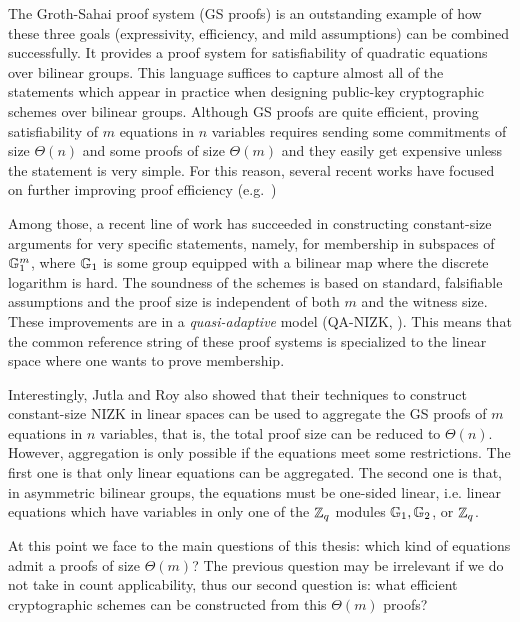 The Groth-Sahai proof system (GS proofs) \cite{SIAMJC:GroSah12} 
  is an outstanding example of how these three goals (expressivity, 
  efficiency, and mild assumptions) can be combined successfully.  
It provides a proof system for satisfiability of quadratic equations over 
  bilinear groups. This language suffices to capture almost all of the 
  statements which appear 
  in practice when designing public-key cryptographic schemes over bilinear groups.  
Although GS proofs are quite efficient, proving satisfiability of $m$ equations in $n$ variables requires 
sending some commitments of size $\Theta(n)$ and some proofs of size $\Theta(m)$ and they 
easily get expensive unless the statement is very simple. For this reason, several recent works 
 have focused on further improving proof efficiency 
 (e.g.\ \cite{PKC:EscGro14,C:EHKRV13,TCC:Rafols15})

Among those, a recent line of work 
  \cite{AC:JutRoy13,C:JutRoy14,EC:KilWee15,EC:LPJY14} 
has succeeded in constructing constant-size  
  arguments for very specific statements, namely, for membership in subspaces of $\mathbb{G}_1^{m}$, 
  where $\mathbb{G}_1$ is some group equipped with a bilinear map where the discrete logarithm is hard. 
The soundness of the schemes is based on standard, falsifiable assumptions 
  and the proof size is independent of both $m$ and the witness size.  These improvements are in a  \textit{quasi-adaptive} 
  model (QA-NIZK, \cite{AC:JutRoy13}).  This means that the common reference string of these proof systems is 
  specialized to the linear space where one wants to prove membership.
  
Interestingly, Jutla and Roy  \cite{C:JutRoy14} also showed that their techniques to construct 
  constant-size NIZK in linear spaces can be used to aggregate the GS proofs of $m$ equations in $n$ variables, that is,  the total proof size can be reduced to $\Theta(n)$. However, aggregation is only possible if the equations meet some restrictions. The first one is that only linear equations can be aggregated. The second one is that, in asymmetric bilinear groups, the equations must be one-sided linear, i.e. linear equations 
  which have variables in only one of the $\mathbb{Z}_q$ modules $\mathbb{G}_1,\mathbb{G}_2$, 
  or $\mathbb{Z}_q$.

At this point we face to the main questions of this thesis: which kind of equations admit a proofs of size $\Theta(m)$? The previous question may be irrelevant if we do not take in count applicability, thus our second question is: what efficient cryptographic schemes can be constructed from this $\Theta(m)$ proofs?

